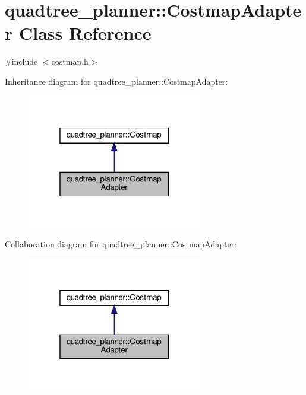 \hypertarget{classquadtree__planner_1_1CostmapAdapter}{}\section{quadtree\+\_\+planner\+:\+:Costmap\+Adapter Class Reference}
\label{classquadtree__planner_1_1CostmapAdapter}


{\ttfamily \#include $<$costmap.\+h$>$}



Inheritance diagram for quadtree\+\_\+planner\+:\+:Costmap\+Adapter\+:\nopagebreak
\begin{figure}[H]
\begin{center}
\leavevmode
\includegraphics[width=217pt]{classquadtree__planner_1_1CostmapAdapter__inherit__graph}
\end{center}
\end{figure}


Collaboration diagram for quadtree\+\_\+planner\+:\+:Costmap\+Adapter\+:\nopagebreak
\begin{figure}[H]
\begin{center}
\leavevmode
\includegraphics[width=217pt]{classquadtree__planner_1_1CostmapAdapter__coll__graph}
\end{center}
\end{figure}
